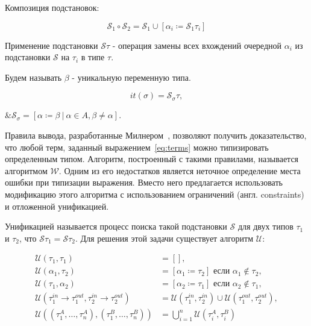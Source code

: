 Композиция подстановок:

\begin{equation}
    \label{eq:subst_comp}
    \mathcal{S}_1 \circ \mathcal{S}_2 = \mathcal{S}_1 \cup \left[ \alpha_i \coloneqq \mathcal{S}_1 \tau_i \right]
\end{equation}

Применение подстановки $\mathcal{S} \tau$ - операция замены всех вхождений очередной $\alpha_i$ из подстановки $\mathcal{S}$ на $\tau_i$ в типе $\tau$.

Будем называть $\beta$ - уникальную переменную типа.

\begin{equation}
    \label{eq:instantiate}
    it(\sigma) = \mathcal{S}_{\sigma} \tau,
\end{equation}
\begin{eqrem}
    &$\mathcal{S}_\sigma = \left[ \alpha \coloneqq \beta ~|~ \alpha \in A, \beta \ne \alpha \right]$.\\
\end{eqrem}

Правила вывода, разработанные Милнером~\cite{UrbanN2009}, позволяют получить доказательство, что любой терм, заданный выражением~\eqref{eq:terms} можно типизировать определенным типом.
Алгоритм, построенный с такими правилами, называется алгоритмом $\mathcal{W}$.
Одним из его недостатков является неточное определение места ошибки при типизации выражения.
Вместо него предлагается использовать модификацию этого алгоритма с использованием ограничений (англ. constraints) и отложенной унификацией.

Унификацией называется процесс поиска такой подстановки $\mathcal{S}$ для двух типов $\tau_1$ и $\tau_2$, что $\mathcal{S} \tau_1 = \mathcal{S} \tau_2$.
Для решения этой задачи существует алгоритм $\mathcal{U}$:

\begin{equation}
    \label{eq:algo_u}
    \begin{aligned}
        \mathcal{U}(\tau_1, \tau_1) &= \left[  \right], \\
        \mathcal{U}(\alpha_1, \tau_2) &= \left[ \alpha_1 \coloneqq \tau_2 \right] \text{ если } \alpha_1 \notin \tau_2, \\
        \mathcal{U}(\tau_1, \alpha_2) &= \left[ \alpha_2 \coloneqq \tau_1 \right] \text{ если } \alpha_2 \notin \tau_1, \\
        \mathcal{U}(\tau^{in}_1 \to \tau^{out}_1, \tau^{in}_2 \to \tau^{out}_2) &= \mathcal{U}(\tau^{in}_1, \tau^{in}_2) \cup \mathcal{U}(\tau^{out}_1, \tau^{out}_2), \\
        \mathcal{U}((\tau_1^A, \ldots, \tau_n^A), (\tau_1^B, \ldots, \tau_n^B)) &= \bigcup_{i = 1}^{n} \mathcal{U}(\tau_i^A, \tau_i^B)
    \end{aligned}
\end{equation}

